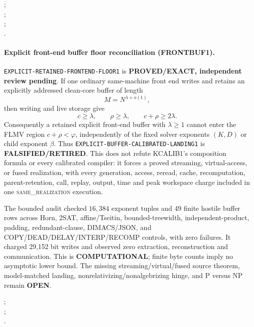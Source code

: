 \documentclass[11pt]{article}
\begin{document}
;\\
;\\
;\\
.

\paragraph{Explicit front-end buffer floor reconciliation (FRONTBUF1).}
\texttt{EXPLICIT-RETAINED-FRONTEND-FLOOR1} is
\textbf{PROVED/EXACT, independent review pending}.  If one ordinary
same-machine front end writes and retains an explicitly addressed clean-core
buffer of length
\[
 M=N^{\lambda+o(1)},
\]
then writing and live storage give
\[
 c\ge\lambda,\qquad \rho\ge\lambda,\qquad c+\rho\ge2\lambda.
\]
Consequently a retained explicit front-end buffer with \(\lambda\ge1\)
cannot enter the FLMV region \(c+\rho<\varphi\), independently of the fixed
solver exponents \((K,D)\) or child exponent \(\beta\).
Thus \texttt{EXPLICIT-BUFFER-CALIBRATED-LANDING1} is
\textbf{FALSIFIED/RETIRED}.  This does not refute KCALIB1's composition
formula or every calibrated compiler: it forces a proved streaming,
virtual-access, or fused realization, with every generation, access, reread,
cache, recomputation, parent-retention, call, replay, output, time and peak
workspace charge included in one \textsc{same\_realization} execution.

The bounded audit checked \(16{,}384\) exponent tuples and 49 finite hostile
buffer rows across Horn, 2SAT, affine/Tseitin, bounded-treewidth,
independent-product, padding, redundant-clause, DIMACS/JSON, and
COPY/DEAD/DELAY/INTERP/RECOMP controls, with zero failures.  It charged
29,152 bit writes and observed zero extraction, reconstruction and
communication.  This is \textbf{COMPUTATIONAL}; finite byte counts imply no
asymptotic lower bound.  The missing streaming/virtual/fused source theorem,
model-matched landing, nonrelativizing/nonalgebrizing hinge, and P versus NP
remain \textbf{OPEN}.

;\\
;\\
.
\end{document}
